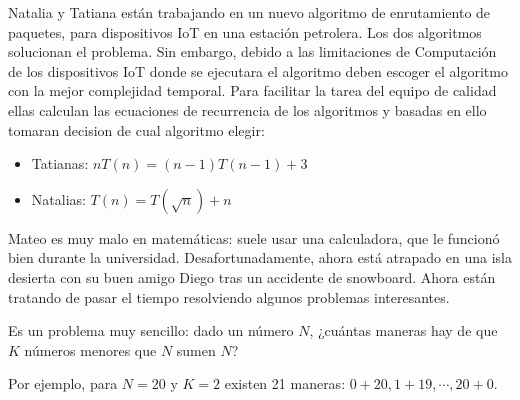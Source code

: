 \documentclass[12pt, a4paper]{exam}
\begin{document}
\begin{questions}
    \pointsdroppedatright
    \question
    Natalia y Tatiana están trabajando en un nuevo algoritmo de enrutamiento de paquetes,
    para dispositivos IoT en una estación petrolera. Los dos algoritmos solucionan el 
    problema. Sin embargo, debido a las limitaciones de Computación de los dispositivos IoT
    donde se ejecutara el algoritmo deben escoger el algoritmo con la mejor complejidad
    temporal. Para facilitar la tarea del equipo de calidad ellas calculan las ecuaciones
    de recurrencia de los algoritmos y basadas en ello tomaran decision de cual algoritmo 
    elegir:
    \begin{itemize}
        \item Tatianas: $ nT(n) = (n-1)T(n-1) + 3$
        \item Natalias: $ T(n) = T(\sqrt{n}) + n$
    \end{itemize}
    
    \question
    Mateo es muy malo en matemáticas: suele usar una calculadora, que le funcionó bien
    durante la universidad. Desafortunadamente, ahora está atrapado en una isla desierta
    con su buen amigo Diego tras un accidente de snowboard. Ahora están tratando de pasar
    el tiempo resolviendo algunos problemas interesantes.

    Es un problema muy sencillo: dado un número $N$, ¿cuántas maneras hay de que $K$
    números menores que $N$ sumen $N$?

    Por ejemplo, para $N=20$ y $K=2$ existen 21 maneras: $0+20,1+19,\cdots,20+0$.

\end{questions}
\end{document}
